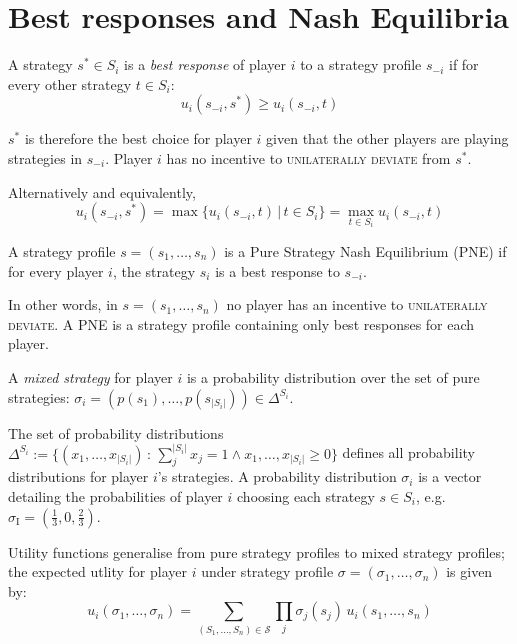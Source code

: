 \section{Best responses and Nash Equilibria}
	\begin{definition}
		A strategy $s^* \in S_i$ is a \textit{best response} of player $i$ to a
		strategy profile $s_{-i}$ if for every other strategy $t \in S_i$:
		\begin{equation}
			u_i(s_{-i}, s^*) \ge u_i(s_{-i}, t)
		\end{equation}
	\end{definition}
	
	$s^*$ is therefore the best choice for player $i$ given that the other
	players are playing strategies in $s_{-i}$. Player $i$ has no incentive to
	\textsc{unilaterally deviate} from $s^*$.

	Alternatively and equivalently,
	\begin{equation}
		u_i(s_{-i}, s^*) = \max \{ u_i(s_{-i}, t) \, | \, t \in S_i \} = \max_{t \in S_i} u_i(s_{-i}, t)
	\end{equation}

	\begin{definition}
		A strategy profile $s = (s_1, \ldots, s_n)$ is a Pure Strategy Nash
		Equilibrium (PNE) if for every player $i$, the strategy $s_i$ is a best
		response to $s_{-i}$.
	\end{definition}

	In other words, in $s = (s_1, \ldots, s_n)$ no player has an incentive to
	\textsc{unilaterally deviate}. A PNE is a strategy profile containing only
	best responses for each player.

	\begin{definition}
		A \textit{mixed strategy} for player $i$ is a probability distribution
		over the set of pure strategies: $\sigma_i = (p(s_1), \ldots,
		p(s_{|S_i|})) \in \Delta^{S_i}$.
	\end{definition}

	The set of probability distributions
	$\Delta^{S_i} := \{ (x_1, \ldots, x_{|S_i|} ) \, : \, \sum_j ^{|S_i|} x_j =
	1 \land x_1, \ldots, x_{|S_i|} \ge 0 \}$ defines all probability
	distributions for player $i$'s strategies. A probability distribution
	$\sigma_i$ is a vector detailing the probabilities of player $i$ choosing
	each strategy $s \in S_i$, e.g. $\sigma_\text{I} = (\frac{1}{3}, 0,
	\frac{2}{3})$.

	\begin{definition}
		Utility functions generalise from pure strategy profiles to mixed
		strategy profiles; the expected utlity for player $i$ under strategy
		profile $\sigma = (\sigma_1, \ldots, \sigma_n)$ is given by:
		\begin{equation}
			\label{eq:expectedUtility}
			u_i(\sigma_1, \ldots, \sigma_n) = \sum_{(S_1, \ldots, S_n) \in
			\mathcal{S}} \prod_j \sigma_j(s_j) \, u_i(s_1, \ldots, s_n)
		\end{equation}

	\end{definition}

